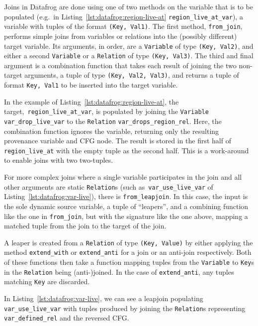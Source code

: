 \documentclass[11pt,a4paper,twoside,openany]{report}
\newcommand{\InRust}[1]{\texttt{#1}}
\renewcommand\_{\textunderscore\allowbreak}
\begin{document}
Joins in Datafrog are done using one of two methods on the variable that is to
be populated (e.g.\ in Listing~\ref{lst:datafrog:region-live-at}
\InRust{region_live_at_var}), a variable with tuples of the format \InRust{(Key,
  Val1)}. The first method, \InRust{from_join}, performs simple joins from
variables or relations into the (possibly different) target variable. Its
arguments, in order, are a \InRust{Variable} of type \InRust{(Key, Val2)}, and
either a second \InRust{Variable} or a \InRust{Relation} of type \InRust{(Key,
  Val3)}. The third and final argument is a combination function that takes each
result of joining the two non-target arguments, a tuple of type \InRust{(Key,
  Val2, Val3)}, and returns a tuple of format \InRust{Key, Val1} to be inserted
into the target variable.

In the example of Listing~\ref{lst:datafrog:region-live-at}, the
target,~\InRust{region_live_at_var}, is populated by joining the
\InRust{Variable} \InRust{var_drop_live_var} to the \InRust{Relation}
\InRust{var_drops_region_rel}. Here, the combination function ignores the
variable, returning only the resulting provenance variable and CFG node. The
result is stored in the first half of \InRust{region_live_at} with the
empty tuple as the second half. This is a work-around to enable joins with two
two-tuples.

For more complex joins where a single variable participates in the join and all
other arguments are static \InRust{Relation}s (such as~\InRust{var_use_live_var}
of Listing~\ref{lst:datafrog:var-live}), there is \InRust{from_leapjoin}. In
this case, the input is the sole dynamic source variable, a tuple of
``leapers'', and a combining function like the one in \InRust{from_join}, but
with the signature like the one above, mapping a matched tuple from the join to
the target of the join.

A leaper is created from a \InRust{Relation} of type \InRust{(Key, Value)} by
either applying the method \InRust{extend_with} or \InRust{extend_anti} for a
join or an anti-join respectively. Both of these functions then take a function
mapping tuples from the \InRust{Variable} to \InRust{Key}s in the
\InRust{Relation} being (anti-)joined. In the case of \InRust{extend_anti}, any
tuples matching \InRust{Key} are discarded.

In Listing~\ref{lst:datafrog:var-live}, we can see a leapjoin populating
\InRust{var_use_live_var} with tuples produced by joining the \InRust{Relation}s
representing \InRust{var_defined_rel} and the reversed CFG\@.
\end{document}

